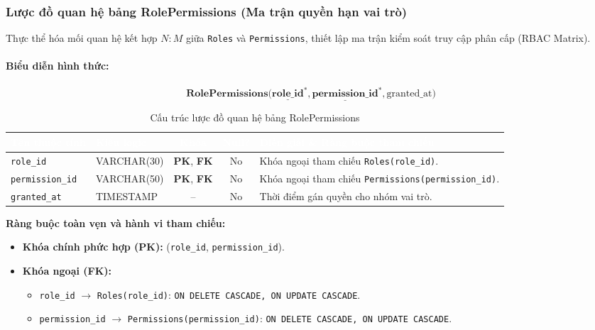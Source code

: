 \subsubsection{Lược đồ quan hệ bảng RolePermissions (Ma trận quyền hạn vai trò)}
Thực thể hóa mối quan hệ kết hợp $N:M$ giữa \texttt{Roles} và \texttt{Permissions}, thiết lập ma trận kiểm soát truy cập phân cấp (RBAC Matrix).

\paragraph{Biểu diễn hình thức:}
\[
\textbf{RolePermissions}\big(
\underline{\textbf{role\_id}}^*, \underline{\textbf{permission\_id}}^*, \text{granted\_at}
\big)
\]

\begin{table}[H]
    \centering
    \small
    \renewcommand{\arraystretch}{1.2}
    \begin{tabularx}{\textwidth}{p{3.0cm} p{2.6cm} c c X}
        \toprule
        \rowcolor{tableheader}\textcolor{white}{\textbf{Tên thuộc tính}} & \textcolor{white}{\textbf{Kiểu logic}} & \textcolor{white}{\textbf{Khóa}} & \textcolor{white}{\textbf{Null?}} & \textcolor{white}{\textbf{Diễn giải \& Ràng buộc tham chiếu}} \\
        \midrule
        \rowcolor{tablerowalt}
        \texttt{role\_id} & VARCHAR(30) & \textcolor{pkcolor}{\textbf{PK}}, \textcolor{fkcolor}{\textbf{FK}} & No & Khóa ngoại tham chiếu \texttt{Roles(role\_id)}. \\
        \texttt{permission\_id} & VARCHAR(50) & \textcolor{pkcolor}{\textbf{PK}}, \textcolor{fkcolor}{\textbf{FK}} & No & Khóa ngoại tham chiếu \texttt{Permissions(permission\_id)}. \\
        \rowcolor{tablerowalt}
        \texttt{granted\_at} & TIMESTAMP & -- & No & Thời điểm gán quyền cho nhóm vai trò. \\
        \bottomrule
    \end{tabularx}
    \caption{Cấu trúc lược đồ quan hệ bảng RolePermissions}
    \label{tab:schema_role_permissions}
\end{table}

\noindent\textbf{Ràng buộc toàn vẹn và hành vi tham chiếu:}
\begin{itemize}[noitemsep,topsep=2pt]
    \item \textbf{Khóa chính phức hợp (PK):} (\texttt{role\_id}, \texttt{permission\_id}).
    \item \textbf{Khóa ngoại (FK):}
    \begin{itemize}[noitemsep]
        \item \texttt{role\_id} $\rightarrow$ \texttt{Roles(role\_id)}: \texttt{ON DELETE CASCADE, ON UPDATE CASCADE}.
        \item \texttt{permission\_id} $\rightarrow$ \texttt{Permissions(permission\_id)}: \texttt{ON DELETE CASCADE, ON UPDATE CASCADE}.
    \end{itemize}
\end{itemize}

